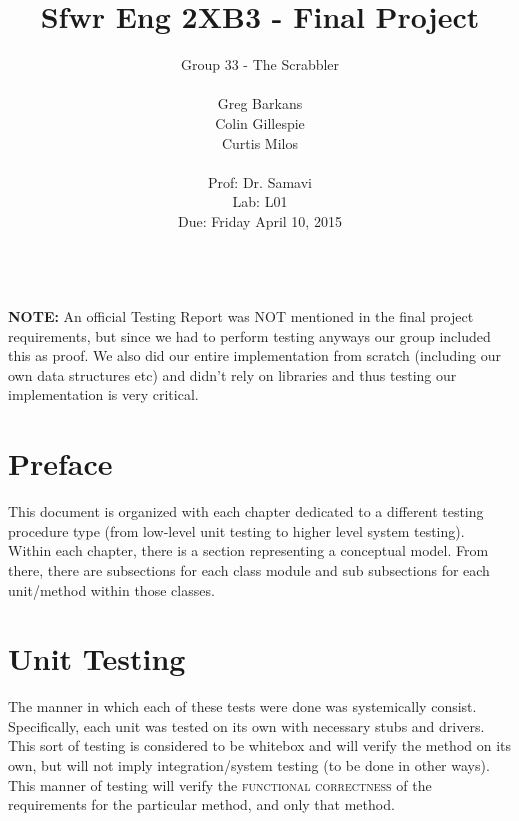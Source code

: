 \documentclass[11pt, oneside]{article}
\title{Sfwr Eng 2XB3 - Final Project}
\author{ 
	Group 33  - The Scrabbler \\ \\         
	Greg Barkans \\
	Colin Gillespie \\
	Curtis Milos \\
	 \vspace{1cm} \\
	Prof: Dr. Samavi \\
	Lab: L01 \\
	Due: Friday April 10, 2015 \\
	\vspace{1cm} \\
}
\date{}
\begin{document}
    
\maketitle                  

\textbf{NOTE:} An official Testing Report was NOT mentioned in the final project requirements, but since we had to perform testing anyways our group included this as proof.  We also did our entire implementation from scratch (including our own data structures etc) and didn't rely on libraries and thus testing our implementation is very critical. 
\newpage     
\tableofcontents   
\newpage             
\listoffigures         
\newpage
\listoftables
\newpage


\section*{Preface}
This document is organized with each chapter dedicated to a different testing procedure type (from low-level unit testing to higher level system testing).  Within each chapter,  there is a section representing a conceptual model.  From there, there are subsections for each class module and sub subsections for each unit/method within those classes.  



\section{Unit Testing}
The manner in which each of these tests were done was systemically consist.  Specifically, each unit was tested on its own with necessary stubs and drivers.  This sort of testing is considered to be whitebox and will verify the method on its own, but will not imply integration/system testing (to be done in other ways).  This manner of testing will verify the \textsc{functional correctness} of the requirements for the particular method, and only that method.
\end{document}
